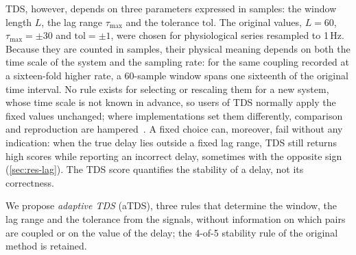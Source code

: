 \documentclass[11pt,a4paper]{article}
\begin{document}
TDS, however, depends on three parameters expressed in samples: the window length $L$, the lag range $\tau_{\max}$ and the tolerance $\mathrm{tol}$. The original values, $L = 60$, $\tau_{\max} = \pm 30$ and $\mathrm{tol} = \pm 1$, were chosen for physiological series resampled to 1\,Hz. Because they are counted in samples, their physical meaning depends on both the time scale of the system and the sampling rate: for the same coupling recorded at a sixteen-fold higher rate, a 60-sample window spans one sixteenth of the original time interval. No rule exists for selecting or rescaling them for a new system, whose time scale is not known in advance, so users of TDS normally apply the fixed values unchanged; where implementations set them differently, comparison and reproduction are hampered~\cite{Steinbrinker2024TdspyOpensource}. A fixed choice can, moreover, fail without any indication: when the true delay lies outside a fixed lag range, TDS still returns high scores while reporting an incorrect delay, sometimes with the opposite sign (\cref{sec:res-lag}). The TDS score quantifies the stability of a delay, not its correctness.

We propose \emph{adaptive TDS} (aTDS), three rules that determine the window, the lag range and the tolerance from the signals, without information on which pairs are coupled or on the value of the delay; the 4-of-5 stability rule of the original method is retained.
\end{document}
